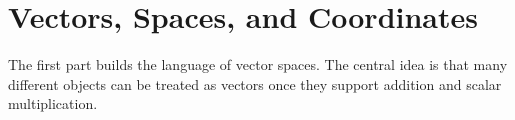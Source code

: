 \part{Vectors, Spaces, and Coordinates}

The first part builds the language of vector spaces. The central idea is that
many different objects can be treated as vectors once they support addition and
scalar multiplication.
